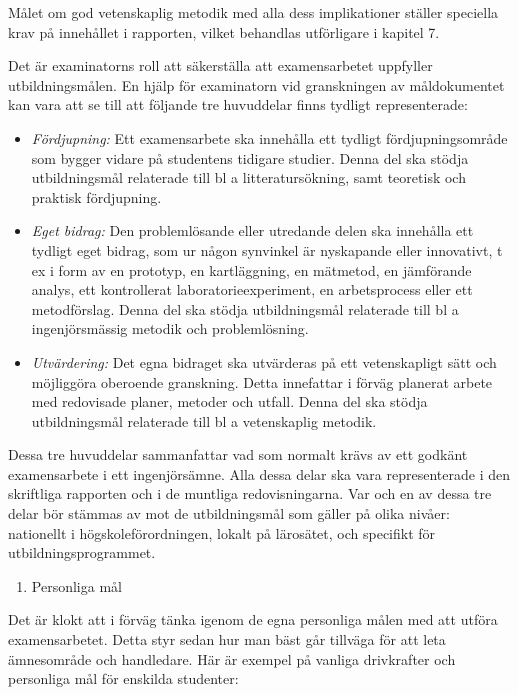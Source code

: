 Målet om god vetenskaplig metodik med alla dess implikationer ställer
speciella krav på innehållet i rapporten, vilket behandlas utförligare i
kapitel 7.

Det är examinatorns roll att säkerställa att examensarbetet uppfyller
utbildningsmålen. En hjälp för examinatorn vid granskningen av
måldokumentet kan vara att se till att följande tre huvuddelar finns
tydligt representerade:

\begin{itemize}
\item
  \emph{Fördjupning:} Ett examensarbete ska innehålla ett tydligt
  fördjupningsområde som bygger vidare på studentens tidigare studier.
  Denna del ska stödja utbildningsmål relaterade till bl a
  litteratursökning, samt teoretisk och praktisk fördjupning.
\item
  \emph{Eget bidrag:} Den problemlösande eller utredande delen ska
  innehålla ett tydligt eget bidrag, som ur någon synvinkel är
  nyskapande eller innovativt, t ex i form av en prototyp, en
  kartläggning, en mätmetod, en jämförande analys, ett kontrollerat
  laboratorieexperiment, en arbetsprocess eller ett metodförslag. Denna
  del ska stödja utbildningsmål relaterade till bl a ingenjörsmässig
  metodik och problemlösning.
\item
  \emph{Utvärdering:} Det egna bidraget ska utvärderas på ett
  vetenskapligt sätt och möjliggöra oberoende granskning. Detta
  innefattar i förväg planerat arbete med redovisade planer, metoder och
  utfall. Denna del ska stödja utbildningsmål relaterade till bl a
  vetenskaplig metodik.
\end{itemize}

Dessa tre huvuddelar sammanfattar vad som normalt krävs av ett godkänt
examensarbete i ett ingenjörsämne. Alla dessa delar ska vara
representerade i den skriftliga rapporten och i de muntliga
redovisningarna. Var och en av dessa tre delar bör stämmas av mot de
utbildningsmål som gäller på olika nivåer: nationellt i
högskoleförordningen, lokalt på lärosätet, och specifikt för
utbildningsprogrammet.

\begin{enumerate}
\def\labelenumi{\arabic{enumi}.}
\item
  Personliga mål
\end{enumerate}

Det är klokt att i förväg tänka igenom de egna personliga målen med att
utföra examensarbetet. Detta styr sedan hur man bäst går tillväga för
att leta ämnesområde och handledare. Här är exempel på vanliga
drivkrafter och personliga mål för enskilda studenter:

